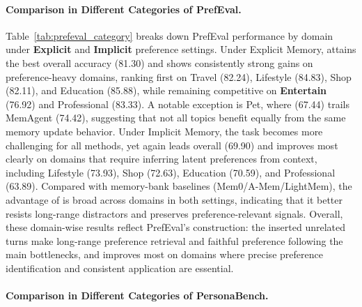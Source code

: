 \paragraph{Comparison in Different Categories of PrefEval.}


Table~\ref{tab:prefeval_category} breaks down PrefEval performance by domain under \textbf{Explicit} and \textbf{Implicit} preference settings. Under Explicit Memory, \ourmodel attains the best overall accuracy (81.30) and shows consistently strong gains on preference-heavy domains, ranking first on Travel (82.24), Lifestyle (84.83), Shop (82.11), and Education (85.88), while remaining competitive on \textbf{Entertain} (76.92) and Professional (83.33). A notable exception is Pet, where \ourmodel (67.44) trails MemAgent (74.42), suggesting that not all topics benefit equally from the same memory update behavior. Under Implicit Memory, the task becomes more challenging for all methods, yet \ourmodel again leads overall (69.90) and improves most clearly on domains that require inferring latent preferences from context, including Lifestyle (73.93), Shop (72.63), Education (70.59), and Professional (63.89). Compared with memory-bank baselines (Mem0/A-Mem/LightMem), the advantage of \ourmodel is broad across domains in both settings, indicating that it better resists long-range distractors and preserves preference-relevant signals. Overall, these domain-wise results reflect PrefEval’s construction: the inserted unrelated turns make long-range preference retrieval and faithful preference following the main bottlenecks, and \ourmodel improves most on domains where precise preference identification and consistent application are essential.



\paragraph{Comparison in Different Categories of PersonaBench.}

